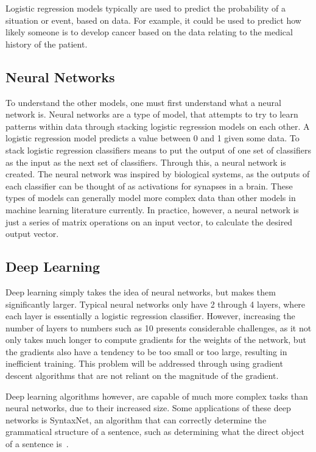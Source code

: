 \documentclass{article}
\begin{document}
Logistic regression models typically are used to predict the probability of a
situation or event, based on data. For example, it could be used to predict how
likely someone is to develop cancer based on the data relating to the medical
history of the patient.

\subsection{Neural Networks}
To understand the other models, one must first understand what a neural network
is. Neural networks are a type of model, that attempts to try to learn patterns
within data through stacking logistic regression models on each other. A
logistic regression model predicts a value between 0 and 1 given some data.  To
stack logistic regression classifiers means to put the output of one set of
classifiers as the input as the next set of classifiers. Through this, a neural
network is created.  The neural network was inspired by biological systems, as
the outputs of each classifier can be thought of as activations for synapses in
a brain. These types of models can generally model more complex data than other
models in machine learning literature currently. In practice, however, a neural
network is just a series of matrix operations on an input vector, to calculate
the desired output vector.

\subsection{Deep Learning}
Deep learning simply takes the idea of neural networks, but makes them
significantly larger. Typical neural networks only have 2 through 4 layers,
where each layer is essentially a logistic regression classifier. However,
increasing the number of layers to numbers such as 10 presents considerable
challenges, as it not only takes much longer to compute gradients for the
weights of the network, but the gradients also have a tendency to be too small
or too large, resulting in inefficient training. This problem will be addressed
through using gradient descent algorithms that are not reliant on the magnitude
of the gradient.

Deep learning algorithms however, are capable of much more complex tasks than
neural networks, due to their increased size. Some applications of these deep
networks is SyntaxNet, an algorithm that can correctly determine the grammatical
structure of a sentence, such as determining what the direct object of a
sentence is~\cite{syntaxnet}.
\end{document}
